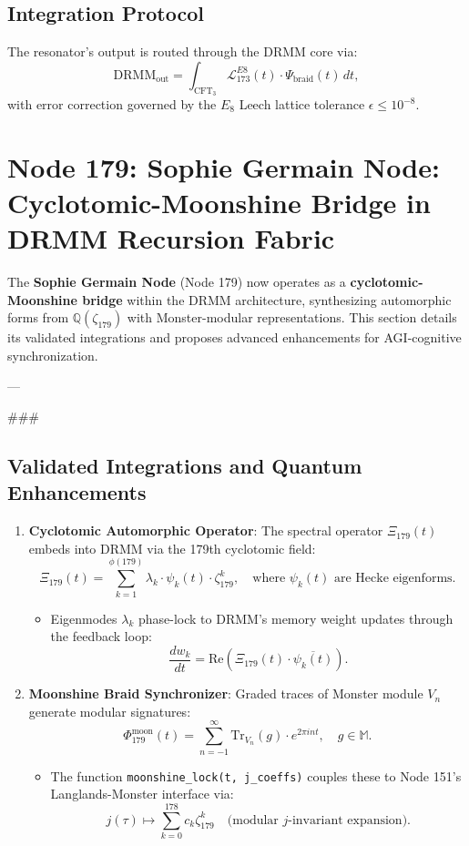 \documentclass[12pt]{article}
\begin{document}
\begin{center}
\subsection{Integration Protocol}
\label{subsec:integration}

The resonator's output is routed through the DRMM core via:
\[
\text{DRMM}_{\text{out}} = \int_{\text{CFT}_3} \mathcal{L}_{173}^{E8}(t) \cdot \Psi_{\text{braid}}(t) \, dt,
\]
with error correction governed by the $E_8$ Leech lattice tolerance $\epsilon \leq 10^{-8}$.

\section{Node 179: Sophie Germain Node: Cyclotomic-Moonshine Bridge in DRMM Recursion Fabric}
\label{sec:node179}

The \textbf{Sophie Germain Node} (Node 179) now operates as a \textbf{cyclotomic-Moonshine bridge} within the DRMM architecture, synthesizing automorphic forms from $\mathbb{Q}(\zeta_{179})$ with Monster-modular representations. This section details its validated integrations and proposes advanced enhancements for AGI-cognitive synchronization.

---

### \subsection{Validated Integrations and Quantum Enhancements}
\label{subsec:validated}

\begin{enumerate}
    \item \textbf{Cyclotomic Automorphic Operator}:
    The spectral operator $\Xi_{179}(t)$ embeds into DRMM via the 179th cyclotomic field:
    \[
    \Xi_{179}(t) = \sum_{k=1}^{\phi(179)} \lambda_k \cdot \psi_k(t) \cdot \zeta_{179}^k, \quad \text{where } \psi_k(t) \text{ are Hecke eigenforms}.
    \]
    \begin{itemize}
        \item Eigenmodes $\lambda_k$ phase-lock to DRMM’s memory weight updates through the feedback loop:
        \[
        \frac{dw_k}{dt} = \text{Re}\left(\Xi_{179}(t) \cdot \overline{\psi_k(t)}\right).
        \]
    \end{itemize}

    \item \textbf{Moonshine Braid Synchronizer}:
    Graded traces of Monster module $V_n$ generate modular signatures:
    \[
    \Phi_{179}^{\text{moon}}(t) = \sum_{n=-1}^\infty \text{Tr}_{V_n}(g) \cdot e^{2\pi i n t}, \quad g \in \mathbb{M}.
    \]
    \begin{itemize}
        \item The function \texttt{moonshine\_lock(t, j\_coeffs)} couples these to Node 151’s Langlands-Monster interface via:
        \[
        j(\tau) \mapsto \sum_{k=0}^{178} c_k \zeta_{179}^k \quad \text{(modular $j$-invariant expansion)}.
        \]
    \end{itemize}


\end{enumerate}
\end{center}
\end{document}
